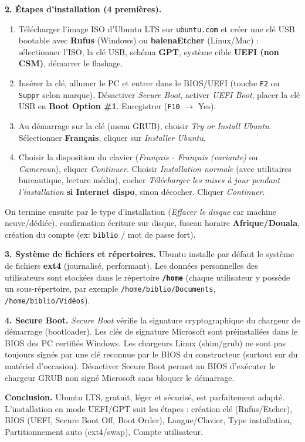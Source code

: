 \documentclass[11pt]{article}
\begin{document}
\begin{exoresolu}
\textbf{2. Étapes d'installation (4 premières).}
\begin{enumerate}
  \item Télécharger l'image ISO d'Ubuntu LTS sur \texttt{ubuntu.com} et créer une clé USB bootable avec \textbf{Rufus} (Windows) ou \textbf{balenaEtcher} (Linux/Mac) : sélectionner l'ISO, la clé USB, schéma \textbf{GPT}, système cible \textbf{UEFI (non CSM)}, démarrer le flashage.
  \item Insérer la clé, allumer le PC et entrer dans le BIOS/UEFI (touche \texttt{F2} ou \texttt{Suppr} selon marque). Désactiver \emph{Secure Boot}, activer \emph{UEFI Boot}, placer la clé USB en \textbf{Boot Option \#1}. Enregistrer (\texttt{F10} $\rightarrow$ Yes).
  \item Au démarrage sur la clé (menu GRUB), choisir \emph{Try or Install Ubuntu}. Sélectionner \textbf{Français}, cliquer sur \emph{Installer Ubuntu}.
  \item Choisir la disposition du clavier (\emph{Français - Français (variante)} ou \emph{Cameroun}), cliquer \emph{Continuer}. Choisir \emph{Installation normale} (avec utilitaires bureautique, lecture média), cocher \emph{Télécharger les mises à jour pendant l'installation} \textbf{si Internet dispo}, sinon décocher. Cliquer \emph{Continuer}.
\end{enumerate}
On termine ensuite par le type d'installation (\emph{Effacer le disque} car machine neuve/dédiée), confirmation écriture sur disque, fuseau horaire \textbf{Afrique/Douala}, création du compte (ex: \texttt{biblio} / mot de passe fort).

\textbf{3. Système de fichiers et répertoires.} Ubuntu installe par défaut le système de fichiers \textbf{ext4} (journalisé, performant). Les données personnelles des utilisateurs sont stockées dans le répertoire \textbf{\texttt{/home}} (chaque utilisateur y possède un sous-répertoire, par exemple \texttt{/home/biblio/Documents}, \texttt{/home/biblio/Vidéos}).

\textbf{4. Secure Boot.} \emph{Secure Boot} vérifie la signature cryptographique du chargeur de démarrage (bootloader). Les clés de signature Microsoft sont préinstallées dans le BIOS des PC certifiés Windows. Les chargeurs Linux (shim/grub) ne sont pas toujours signés par une clé reconnue par le BIOS du constructeur (surtout sur du matériel d'occasion). Désactiver Secure Boot permet au BIOS d'exécuter le chargeur GRUB non signé Microsoft sans bloquer le démarrage.

\textbf{Conclusion.} Ubuntu LTS, gratuit, léger et sécurisé, est parfaitement adapté. L'installation en mode UEFI/GPT suit les étapes : création clé (Rufus/Etcher), BIOS (UEFI, Secure Boot Off, Boot Order), Langue/Clavier, Type installation, Partitionnement auto (ext4/swap), Compte utilisateur.
\end{exoresolu}
\end{document}
